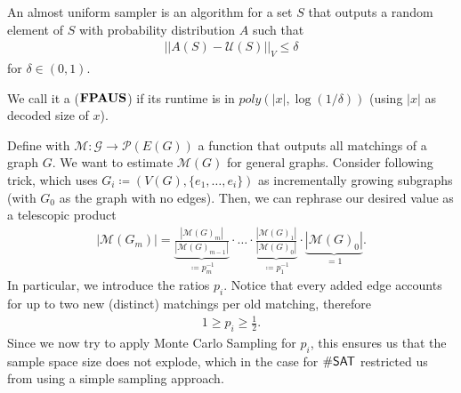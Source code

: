 \begin{definition}
    An almost uniform sampler is an algorithm for a set $S$ that
    outputs a random element of $S$ with probability distribution $A$ such that
    \begin{align*}
        || A(S) - \mathcal{U}(S)||_V \leq \delta
    \end{align*}
    for $\delta \in (0,1)$.

    We call it a  ($\mathbf{FPAUS}$)
    if its runtime is in $poly(|x|, \log(1/\delta))$ (using $|x|$ as decoded size of $x$).
\end{definition}
Define with $\mathcal M : \mathcal G \rightarrow \mathcal P(E(G))$ a function that outputs all matchings of a graph $G$.
We want to estimate $\mathcal M(G)$ for general graphs.
Consider following trick, which uses $G_i \coloneqq (V(G), \{e_1, \dots, e_i\})$
as incrementally growing subgraphs (with $G_0$ as the graph with no edges).
Then, we can rephrase our desired value as a telescopic product
\begin{align}
    |\mathcal M(G_{m})| = \underbrace{\frac{|\mathcal M(G)_{m}|}{|\mathcal M(G)_{m-1}|}}_{\coloneqq p_m^{-1}}\cdot \hdots \cdot \underbrace{\frac{|\mathcal M(G)_{1}|}{|\mathcal M(G)_{0}|}}_{\coloneqq p_1^{-1}} \cdot \underbrace{|\mathcal M(G)_{0}|}_{=1}.
\end{align}
In particular, we introduce the ratios $p_i$. Notice that every added edge accounts for up to two new (distinct) matchings per old matching, therefore
\begin{align}
    1 \geq p_i \geq \frac{1}{2}.
\end{align}
Since we now try to apply Monte Carlo Sampling for $p_i$, this ensures us that the sample space size does not explode,
which in the case for $\mathsf{\#SAT}$ restricted us from using a simple sampling approach.

